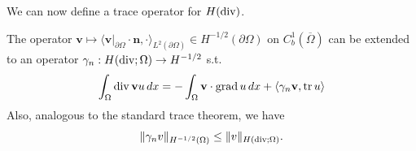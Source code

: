 \documentclass[../main.tex]{subfiles}
\begin{document}
We can now define a trace operator for $H(\operatorname{div})$.
\begin{theorem}\label{thm:trace_of_hdiv}
    The operator $\mathbf{v} \mapsto \langle \mathbf{v}|_{\partial \Omega} \cdot \mathbf{n}, \cdot
    \rangle_{L^2(\partial \Omega)} \in H^{-1/2}(\partial\Omega)$
    on $C^1_b(\overline{\Omega})$ can be extended to an operator 
    $\gamma_n: H(\operatorname{div};\Omega) \rightarrow H^{-1/2}$ s.t.
    \begin{align*}
        \int_\Omega \operatorname{div} \mathbf{v} u \, dx 
        = -\int_\Omega \mathbf{v} \cdot \operatorname{grad} u \, dx + \langle \gamma_n \mathbf{v}, \operatorname{tr} u \rangle
    \end{align*}
    Also, analogous to the standard trace theorem, we have
    \begin{align*}
        \lVert \gamma_n v \rVert _{H^{-1/2}(\Omega)} 
        \leq     \lVert v \rVert _{H(\operatorname{div}; \Omega)}.
    \end{align*}
\end{theorem}
\end{document}
